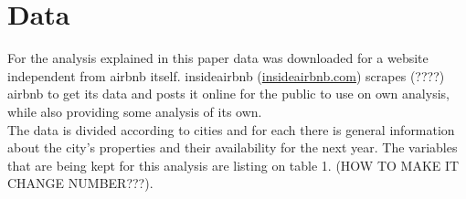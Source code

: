 \section{Data}\label{Sec:Data}

For the analysis explained in this paper data was downloaded for a website independent from airbnb itself. insideairbnb (\href{http://insideairbnb.com/}{insideairbnb.com}) scrapes (????) airbnb to get its data and posts it online for the public to use on own analysis, while also providing some analysis of its own.
\\
The data is divided according to cities and for each there is general information about the city's properties and their availability for the next year. The variables that are being kept for this analysis are listing on table 1. (HOW TO MAKE IT CHANGE NUMBER???).



